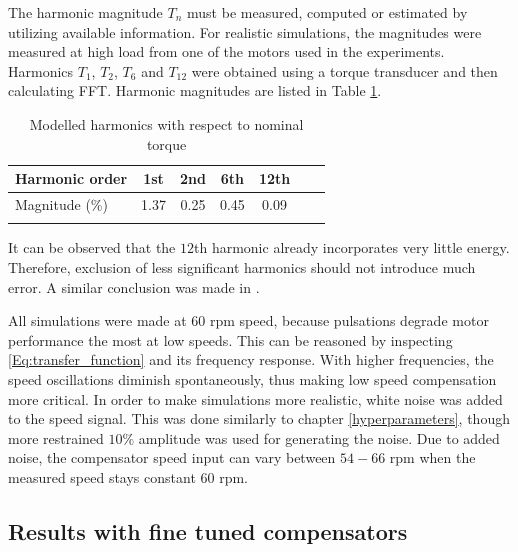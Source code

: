The harmonic magnitude $T_n$ must be measured, computed or estimated by utilizing available information. For realistic simulations, the magnitudes were measured at high load from one of the motors used in the experiments. Harmonics $T_1$, $T_2$, $T_6$ and $T_{12}$ were obtained using a torque transducer and then calculating FFT. Harmonic magnitudes are listed in Table \ref{Harmonics}.
\begin{table}[tb]
\caption{Modelled harmonics with respect to nominal torque}
\centering
\begin{tabular}[t]{lcccccc}
\hline
Harmonic order   & 1st & 2nd & 6th & 12th \\
\hline
Magnitude (\%)   & \num{1.37} & \num{0.25} & \num{0.45} & \num{0.09} \\
\hline
\label{Harmonics}
\end{tabular}%
\end{table}%
It can be observed that the $12$th harmonic already incorporates very little energy. Therefore, exclusion of less significant harmonics should not introduce much error. A similar conclusion was made in \cite{CTR_SW:1998}.

All simulations were made at $60$ rpm speed, because pulsations degrade motor performance the most at low speeds. This can be reasoned by inspecting \eqref{Eq:transfer_function} and its frequency response. With higher frequencies, the speed oscillations diminish spontaneously, thus making low speed compensation more critical. In order to make simulations more realistic, white noise was added to the speed signal. This was done similarly to chapter \ref{hyperparameters}, though more restrained $10\%$ amplitude was used for generating the noise. Due to added noise, the compensator speed input can vary between $54-66$ rpm when the measured speed stays constant $60$ rpm.

\subsection{Results with fine tuned compensators} \label{Results with fine tuned compensators}

